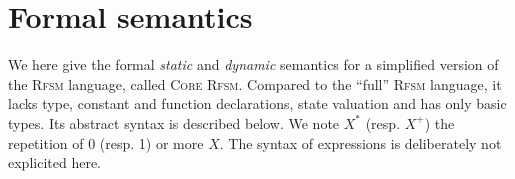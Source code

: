\chapter{Formal semantics}
\label{cha:semantics}

\newcommand{\truev}{\mathsf{T}}
\newcommand{\tuple}[1]{\langle#1\rangle}
\newcommand{\ttuple}[2]{\langle#1, #2\rangle}
\newcommand{\tttuple}[3]{\langle#1, #2, #3\rangle}
\newcommand{\ttttuple}[4]{\langle#1, #2, #3, #4\rangle}
\newcommand{\tttttuple}[5]{\langle#1, #2, #3, #4, #5\rangle}
\newcommand{\ttttttuple}[6]{\langle#1, #2, #3, #4, #5, #6\rangle}
\newcommand{\tttttttuple}[7]{\langle#1, #2, #3, #4, #5, #6\rangle}
\newcommand{\ttttttttuple}[8]{\langle#1, #2, #3, #4, #5, #6\rangle}
\newcommand{\tuplen}[1]{\langle#1_1,\ldots,#1_n\rangle}
\newcommand{\tuplez}{\langle\rangle}
\newcommand{\cupp}[3]{\displaystyle{\bigcup_{#1}^{#2}}~#3}
\newcommand{\capp}[3]{\displaystyle{\bigcap_{#1}^{#2}}~#3}
\newcommand{\oplusn}[3]{\displaystyle{\bigoplus_{#1}^{#2}}~#3}
\newcommand{\valred}[2]{\rho_{#2}(#1)}
\newcommand{\emptyseq}{\langle\rangle}
\newcommand{\sequ}[1]{\langle#1\rangle}
\newcommand{\ssequ}[2]{\langle#1; #2\rangle}
\newcommand{\sssequ}[3]{\langle#1; #2; #3\rangle}
\newcommand{\sequn}[1]{\langle#1_1;\ldots;#1_n\rangle}
\newcommand{\sequm}[2]{\langle#1_1;\ldots;#1_#2\rangle}
\newcommand{\squn}[1]{#1_1,\ldots,#1_n}

\newcommand{\delt}[4]{\ttttuple{#1}{#2}{#3}{#4}}
\newcommand{\trans}[3]{#1 \xrightarrow{#2} #3}
\newcommand{\transs}[4]{#1 \xrightarrow[#3]{#2} #4}
\newcommand\doubleplus{+\kern-1.3ex+\kern0.8ex}

\newcommand{\larrow}{\xrightarrow}
\newcommand{\seqn}[3]{#3_#1,\ldots,#3_#2}
\newcommand{\cuppn}[1]{\cupp{i=1}{n}{#1}}
\newcommand{\setn}[1]{\{#1_1,\ldots,#1_n\}}
\newcommand{\mm}{\mathcal{M}}
\newcommand{\ssigma}{\overline{\sigma}}
\newcommand{\ssigm}{\overline{s}}
\newcommand{\eval}[2]{\mathcal{E}_{#1}\llbracket #2 \rrbracket}
\newcommand{\falln}[3]{\forall #1\in\{#2,\ldots,#3\}\quad}
\newcommand{\semfn}[3]{\mathcal{#1}_{#2}\llbracket #3 \rrbracket}
\newcommand{\vars}{\mathcal{V}}
\newcommand{\env}{\Gamma}
\newcommand{\expr}{\mathsf{e}}
\newcommand{\cupdot}{\mathbin{\mathaccent\cdot\cup}}

We here give the formal \emph{static} and \emph{dynamic} semantics for a simplified version of the
\textsc{Rfsm} language, called \textsc{Core Rfsm}. Compared to the ``full'' \textsc{Rfsm} language,
it lacks type, constant and function declarations, state valuation and has only basic types. 
Its abstract syntax is described below. We note $X^*$ (resp. $X^+$) the repetition of 0
(resp. 1) or more $X$. The syntax of expressions is deliberately not explicited here. 

